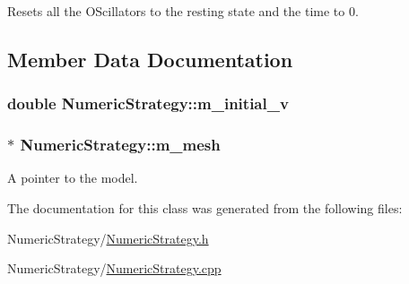 Resets all the O\+Scillators to the resting state and the time to 0. 



\subsection{Member Data Documentation}
\hypertarget{class_numeric_strategy_a4ee8b2dbaa436c241384f959cc5fe54d}{
\subsubsection[{m\+\_\+initial\+\_\+v}]{\setlength{\rightskip}{0pt plus 5cm}double Numeric\+Strategy\+::m\+\_\+initial\+\_\+v}}\label{class_numeric_strategy_a4ee8b2dbaa436c241384f959cc5fe54d}
\hypertarget{class_numeric_strategy_a2ca52f550fd3f1cc26c65aec0cacf2f6}{
\subsubsection[{m\+\_\+mesh}]{$\ast$ Numeric\+Strategy\+::m\+\_\+mesh}}\label{class_numeric_strategy_a2ca52f550fd3f1cc26c65aec0cacf2f6}


A pointer to the model. 



The documentation for this class was generated from the following files\+:\begin{DoxyCompactItemize}
\item 
Numeric\+Strategy/\hyperlink{_numeric_strategy_8h}{Numeric\+Strategy.\+h}\item 
Numeric\+Strategy/\hyperlink{_numeric_strategy_8cpp}{Numeric\+Strategy.\+cpp}\end{DoxyCompactItemize}
